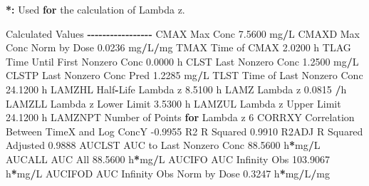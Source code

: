 \documentclass[
  12pt,
]{krantz}
\newenvironment{Shaded}{\begin{snugshade}}{\end{snugshade}}
\newcommand{\ControlFlowTok}[1]{\textcolor[rgb]{0.13,0.29,0.53}{\textbf{#1}}}
\newcommand{\DecValTok}[1]{\textcolor[rgb]{0.00,0.00,0.81}{#1}}
\newcommand{\ErrorTok}[1]{\textcolor[rgb]{0.64,0.00,0.00}{\textbf{#1}}}
\newcommand{\FloatTok}[1]{\textcolor[rgb]{0.00,0.00,0.81}{#1}}
\newcommand{\NormalTok}[1]{#1}
\newcommand{\OperatorTok}[1]{\textcolor[rgb]{0.81,0.36,0.00}{\textbf{#1}}}
\newcommand{\StringTok}[1]{\textcolor[rgb]{0.31,0.60,0.02}{#1}}
\begin{document}
\begin{Shaded}
\begin{Highlighting}[]
\OperatorTok{*}\ErrorTok{:}\StringTok{ }\NormalTok{Used }\ControlFlowTok{for}\NormalTok{ the calculation of Lambda z.}


\NormalTok{Calculated Values}
\OperatorTok{{-}{-}{-}{-}{-}{-}{-}{-}{-}{-}{-}{-}{-}{-}{-}{-}{-}}
\NormalTok{CMAX       Max Conc                                        }\FloatTok{7.5600}\NormalTok{ mg}\OperatorTok{/}\NormalTok{L}
\NormalTok{CMAXD      Max Conc Norm by Dose                           }\FloatTok{0.0236}\NormalTok{ mg}\OperatorTok{/}\NormalTok{L}\OperatorTok{/}\NormalTok{mg}
\NormalTok{TMAX       Time of CMAX                                    }\FloatTok{2.0200}\NormalTok{ h}
\NormalTok{TLAG       Time Until First Nonzero Conc                   }\FloatTok{0.0000}\NormalTok{ h}
\NormalTok{CLST       Last Nonzero Conc                               }\FloatTok{1.2500}\NormalTok{ mg}\OperatorTok{/}\NormalTok{L}
\NormalTok{CLSTP      Last Nonzero Conc Pred                          }\FloatTok{1.2285}\NormalTok{ mg}\OperatorTok{/}\NormalTok{L}
\NormalTok{TLST       Time of Last Nonzero Conc                      }\FloatTok{24.1200}\NormalTok{ h}
\NormalTok{LAMZHL     Half}\OperatorTok{{-}}\NormalTok{Life Lambda z                              }\FloatTok{8.5100}\NormalTok{ h}
\NormalTok{LAMZ       Lambda z                                        }\FloatTok{0.0815} \OperatorTok{/}\NormalTok{h}
\NormalTok{LAMZLL     Lambda z Lower Limit                            }\FloatTok{3.5300}\NormalTok{ h}
\NormalTok{LAMZUL     Lambda z Upper Limit                           }\FloatTok{24.1200}\NormalTok{ h}
\NormalTok{LAMZNPT    Number of Points }\ControlFlowTok{for}\NormalTok{ Lambda z                   }\DecValTok{6}
\NormalTok{CORRXY     Correlation Between TimeX and Log ConcY        }\FloatTok{{-}0.9955} 
\NormalTok{R2         R Squared                                       }\FloatTok{0.9910} 
\NormalTok{R2ADJ      R Squared Adjusted                              }\FloatTok{0.9888} 
\NormalTok{AUCLST     AUC to Last Nonzero Conc                       }\FloatTok{88.5600}\NormalTok{ h}\OperatorTok{*}\NormalTok{mg}\OperatorTok{/}\NormalTok{L}
\NormalTok{AUCALL     AUC All                                        }\FloatTok{88.5600}\NormalTok{ h}\OperatorTok{*}\NormalTok{mg}\OperatorTok{/}\NormalTok{L}
\NormalTok{AUCIFO     AUC Infinity Obs                              }\FloatTok{103.9067}\NormalTok{ h}\OperatorTok{*}\NormalTok{mg}\OperatorTok{/}\NormalTok{L}
\NormalTok{AUCIFOD    AUC Infinity Obs Norm by Dose                   }\FloatTok{0.3247}\NormalTok{ h}\OperatorTok{*}\NormalTok{mg}\OperatorTok{/}\NormalTok{L}\OperatorTok{/}\NormalTok{mg}

\end{Highlighting}
\end{Shaded}
\end{document}
